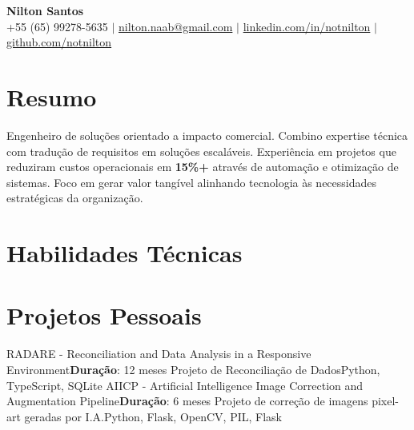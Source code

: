 



\begin{center}
  \textbf{\Huge Nilton Santos} \\
  \small +55 (65) 99278-5635 $|$ \href{mailto:nilton.naab@gmail.com}{nilton.naab@gmail.com} $|$ 
  \href{https://linkedin.com/in/notnilton}{linkedin.com/in/notnilton} $|$
  \href{https://github.com/notnilton}{github.com/notnilton}
\end{center}

\section*{Resumo}

Engenheiro de soluções orientado a impacto comercial. Combino expertise técnica com tradução de requisitos em soluções escaláveis. Experiência em projetos que reduziram custos operacionais em \textbf{15\%+} através de automação e otimização de sistemas. Foco em gerar valor tangível alinhando tecnologia às necessidades estratégicas da organização.

\section{Habilidades Técnicas}
\resumeSubHeadingList
\resumeSubHeadingListEnd

\section{Projetos Pessoais}
\resumeSubHeadingList
  \resumeSubheading
      {RADARE - Reconciliation and Data Analysis in a Responsive Environment}{\textbf{Duração}: 12 meses}
      {Projeto de Reconciliação de Dados}{Python, TypeScript, SQLite}
  \resumeSubHeadingList
  \resumeSubHeadingListEnd
  \resumeSubheading
      {AIICP - Artificial Intelligence Image Correction and Augmentation Pipeline}{\textbf{Duração}: 6 meses} 
      {Projeto de correção de imagens pixel-art geradas por I.A.}{Python, Flask, OpenCV, PIL, Flask}
  \resumeSubHeadingList
  \resumeSubHeadingListEnd
\resumeSubHeadingListEnd

